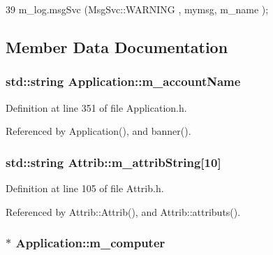 \begin{DoxyCode}
39 { m_log.msgSvc (MsgSvc::WARNING , mymsg, m_name ); }
\end{DoxyCode}


\subsection{Member Data Documentation}
\hypertarget{classApplication_ac6ecd97be07092147986a7a5965c54ec}{
\subsubsection[{m\_\-accountName}]{\setlength{\rightskip}{0pt plus 5cm}std::string {\bf Application::m\_\-accountName}}}
\label{classApplication_ac6ecd97be07092147986a7a5965c54ec}


Definition at line 351 of file Application.h.

Referenced by Application(), and banner().\hypertarget{classAttrib_a3414521d7a82476e874b25a5407b5e63}{
\subsubsection[{m\_\-attribString}]{\setlength{\rightskip}{0pt plus 5cm}std::string {\bf Attrib::m\_\-attribString}\mbox{[}10\mbox{]}}}
\label{classAttrib_a3414521d7a82476e874b25a5407b5e63}


Definition at line 105 of file Attrib.h.

Referenced by Attrib::Attrib(), and Attrib::attributs().\hypertarget{classApplication_a17c9fd27b6abbc18abb6d5de5d7648ef}{
\subsubsection[{m\_\-computer}]{$\ast$ {\bf Application::m\_\-computer}}}
\label{classApplication_a17c9fd27b6abbc18abb6d5de5d7648ef}


